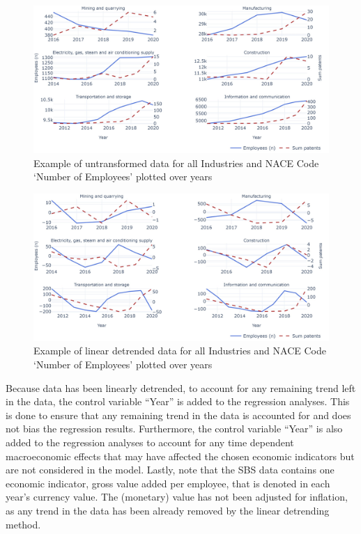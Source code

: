 \documentclass[
  12pt,
  a4paperpaper,
]{article}
\begin{document}
\begin{figure}[H]

{\centering \includegraphics{rieg2023_files/figure-pdf/fig-untransformed-data-example-output-1.jpeg}

}

\caption{\label{fig-untransformed-data-example}Example of untransformed
data for all Industries and NACE Code `Number of Employees' plotted over
years}

\end{figure}

\begin{figure}[H]

{\centering \includegraphics{rieg2023_files/figure-pdf/fig-transformed-data-example-output-1.jpeg}

}

\caption{\label{fig-transformed-data-example}Example of linear detrended
data for all Industries and NACE Code `Number of Employees' plotted over
years}

\end{figure}

Because data has been linearly detrended, to account for any remaining
trend left in the data, the control variable ``Year'' is added to the
regression analyses. This is done to ensure that any remaining trend in
the data is accounted for and does not bias the regression results.
Furthermore, the control variable ``Year'' is also added to the
regression analyses to account for any time dependent macroeconomic
effects that may have affected the chosen economic indicators but are
not considered in the model. Lastly, note that the SBS data contains one
economic indicator, gross value added per employee, that is denoted in
each year's currency value. The (monetary) value has not been adjusted
for inflation, as any trend in the data has been already removed by the
linear detrending method.
\end{document}
